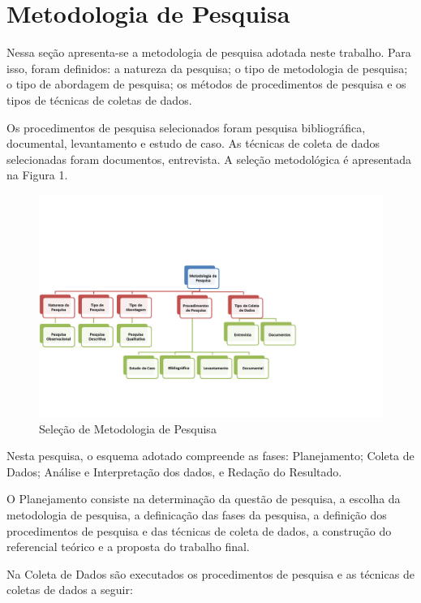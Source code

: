 \section[Metodologia de Pesquisa]{Metodologia de Pesquisa}

Nessa seção apresenta-se a metodologia de pesquisa adotada neste trabalho.
Para isso, foram definidos: a natureza da pesquisa; o tipo de metodologia de pesquisa; o tipo de abordagem de pesquisa; os métodos de
procedimentos de pesquisa e os tipos de técnicas de coletas de dados.

Os procedimentos de pesquisa selecionados foram pesquisa bibliográfica,
documental, levantamento e estudo de caso. As técnicas de coleta de dados selecionadas foram
documentos, entrevista. A seleção
metodológica é apresentada na Figura 1.

	\begin{figure}[h]
		\centering
		\label{fig01}
			\includegraphics[scale=0.7]{figuras/metodologiapesquisa.png}
		\caption{Seleção de Metodologia de Pesquisa}
	\end{figure}

Nesta pesquisa, o esquema adotado compreende as fases: Planejamento; Coleta
de Dados; Análise e Interpretação dos dados, e Redação do Resultado. 

O Planejamento consiste na determinação da questão de pesquisa, a escolha da metodologia de pesquisa, a definicação das fases da pesquisa,  a definição dos procedimentos de pesquisa e das técnicas de coleta de dados, a construção do referencial teórico e a proposta do trabalho final.


Na Coleta de Dados são executados os procedimentos de pesquisa e as técnicas de coletas de dados a seguir:

